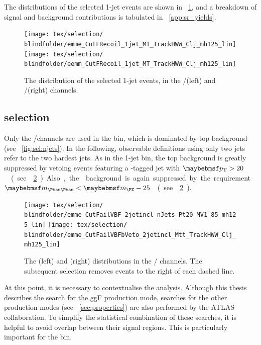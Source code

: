 The \mt distributions of the selected 1-jet events are shown in \Figure~\ref{fig:sel:1j:mt}, 
and a breakdown of signal and background contributions is tabulated in 
\Appendix~\ref{app:sr_yields}.

\begin{figure}[t]
	\texttt{[image: tex/selection/\\blindfolder/emme\_CutFRecoil\_1jet\_MT\_TrackHWW\_Clj\_mh125\_lin]}
	\hfill
	\texttt{[image: tex/selection/\\blindfolder/eemm\_CutFRecoil\_1jet\_MT\_TrackHWW\_Clj\_mh125\_lin]}
	\caption{The \mt distribution of the selected 1-jet events, in the \emch/\mech (left) and 
	\eech/\mmch (right) channels.}
	\label{fig:sel:1j:mt}
\end{figure}



\subsection{\twojet selection}
\label{sec:selection:2j}

Only the \emch/\mech channels are used in the \twojet bin, which is dominated by top 
background (see \Figure~\ref{fig:sel:njets}). In the following, observable definitions using 
only two jets refer to the two hardest jets. As in the 1-jet bin, the top background is 
greatly suppressed by vetoing events featuring a \Pbottom-tagged jet with 
\unit{$\pt > 20$}{\GeV} (see \Figure~\ref{fig:sel:2j:df_cuts}). Also, the \DYtt background 
is again suppressed by the requirement \unit{$\mtautau < \mZ - 25$}{\GeV} (see 
\Figure~\ref{fig:sel:2j:df_cuts}).

\begin{figure}[t]
	\texttt{[image: tex/selection/\\blindfolder/emme\_CutFailVBF\_2jetincl\_nJets\_Pt20\_MV1\_85\_mh125\_lin]}
	\hfill
	\texttt{[image: tex/selection/\\blindfolder/emme\_CutFailVBFbVeto\_2jetincl\_Mtt\_TrackHWW\_Clj\_mh125\_lin]}
	\caption{The \nbjets (left) and \mtautau (right) distributions in the \emch/\mech 
	channels. The subsequent selection removes events to the right of each dashed line.}
	\label{fig:sel:2j:df_cuts}
\end{figure}

At this point, it is necessary to contextualise the analysis. Although this thesis 
describes the search for the ggF production mode, searches for the other production modes 
(see \Section~\ref{sec:properties}) are also performed by the ATLAS collaboration. To 
simplify the statistical combination of these searches, it is helpful to avoid overlap 
between their signal regions. This is particularly important for the \twojet bin.

